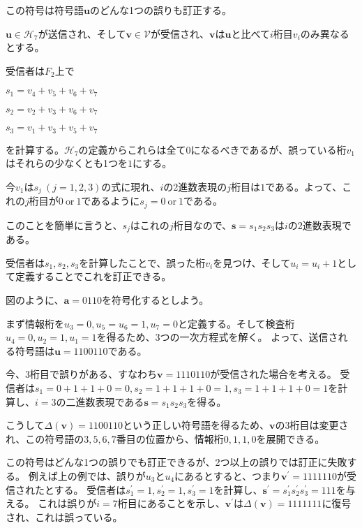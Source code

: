 \documentclass[12pt,a4paper]{article}
\begin{document}
この符号は符号語\(\mathbf{u}\)のどんな1つの誤りも訂正する。

\(\mathbf{u} \in \mathcal{H}_7\)が送信され、そして\(\mathbf{v} \in \mathcal{V}\)が受信され、\(\mathbf{v}\)は\(\mathbf{u}\)と比べて\(i\)桁目\(v_i\)のみ異なるとする。

受信者は\(F_2\)上で

\(s_1 = v_4 + v_5 + v_6 + v_7\)

\(s_2 = v_2 + v_3 + v_6 + v_7\)

\(s_3 = v_1 + v_3 + v_5 + v_7\)

を計算する。\(\mathcal{H}_7\)の定義からこれらは全て\(0\)になるべきであるが、誤っている桁\(v_1\)はそれらの少なくとも1つを\(1\)にする。

今\(v_1\)は\(s_j \ (j = 1,2,3)\)の式に現れ、\(i\)の2進数表現の\(j\)桁目は\(1\)である。よって、これの\(j\)桁目が\(0 \ \text{or}\ 1\)であるように\(s_j = 0 \ \text{or} \ 1\)である。

このことを簡単に言うと、\(s_j\)はこれの\(j\)桁目なので、\(\mathbf{s} = s_1 s_2 s_3\)は\(i\)の2進数表現である。

受信者は\(s_1, s_2, s_3\)を計算したことで、誤った桁\(v_i\)を見つけ、そして\(u_i = u_i + 1\)として定義することでこれを訂正できる。

図のように、\(\mathbf{a} = 0110\)を符号化するとしよう。

まず情報桁を\(u_3 = 0, u_5 = u_6 = 1, u_7 = 0\)と定義する。そして検査桁\(u_4 = 0, u_2 = 1, u_1 = 1\)を得るため、3つの一次方程式を解く。
よって、送信される符号語は\(\mathbf{u} = 1100110\)である。

今、3桁目で誤りがある、すなわち\(\mathbf{v} = 1110110\)が受信された場合を考える。
受信者は\(s_1 = 0 + 1 + 1 + 0 = 0 , s_2 = 1 + 1 + 1 + 0 = 1, s_3 = 1 + 1 + 1 + 0 = 1\)を計算し、\(i = 3\)の二進数表現である\(\mathbf{s} = s_1 s_2 s_3\)を得る。

こうして\(\Delta (\mathbf{v}) = 1100110\)という正しい符号語を得るため、\(\mathbf{v}\)の3桁目は変更され、この符号語の\(3,5,6,7\)番目の位置から、情報桁\(0, 1, 1, 0\)を展開できる。

この符号はどんな1つの誤りでも訂正できるが、2つ以上の誤りでは訂正に失敗する。
例えば上の例では、誤りが\(u_3\)と\(u_4\)にあるとすると、つまり\(\mathbf{v}^\prime = 1111110\)が受信されたとする。
受信者は\(s_1^\prime = 1, s_2^\prime = 1 , s_3^\prime = 1\)を計算し、\(\mathbf{s}^\prime = s_1^\prime s_2^\prime s_3^\prime = 111\)を与える。
これは誤りが\(i = 7\)桁目にあることを示し、\(\mathbf{v}^\prime\)は\(\Delta (\mathbf{v}) = 1111111\)に復号され、これは誤っている。
\end{document}
